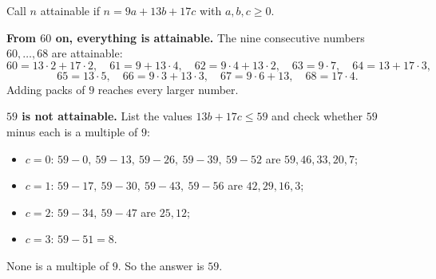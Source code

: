 Call $n$ attainable if $n=9a+13b+17c$ with $a,b,c\ge0$.

\textbf{From $60$ on, everything is attainable.} The nine consecutive numbers $60,\ldots,68$ are attainable:
\[60=13\cdot2+17\cdot2,\quad 61=9+13\cdot4,\quad 62=9\cdot4+13\cdot2,\quad 63=9\cdot7,\quad 64=13+17\cdot3,\]
\[65=13\cdot5,\quad 66=9\cdot3+13\cdot3,\quad 67=9\cdot6+13,\quad 68=17\cdot4 .\]
Adding packs of $9$ reaches every larger number.

\textbf{$59$ is not attainable.} List the values $13b+17c\le59$ and check whether $59$ minus each is a multiple of $9$:
\begin{itemize}
\item $c=0$: $59-0,\ 59-13,\ 59-26,\ 59-39,\ 59-52$ are $59,46,33,20,7$;
\item $c=1$: $59-17,\ 59-30,\ 59-43,\ 59-56$ are $42,29,16,3$;
\item $c=2$: $59-34,\ 59-47$ are $25,12$;
\item $c=3$: $59-51=8$.
\end{itemize}
None is a multiple of $9$. So the answer is $\boxed{59}$.
